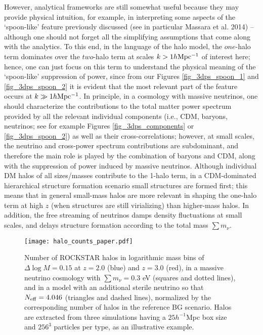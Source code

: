 \documentclass{emulateapj}
\begin{document}
However, analytical frameworks are still somewhat useful because they may provide physical intuition, 
for example, in interpreting some aspects of the  `spoon-like' feature previously discussed (see in particular Massara et al. 2014) -- although one should not forget all the simplifying 
assumptions that come along with the analytics.
To this end,  in the language of the halo model,
the $one$-halo term dominates over the $two$-halo term at scales $k>1 h {\rm Mpc^{-1}}$ of interest here; hence, one  can just focus on this term to
understand the physical meaning of the 
`spoon-like' suppression of power, since from our Figures \ref{fig_3dps_spoon_1} and \ref{fig_3dps_spoon_2}
it is evident that the most relevant part of the feature occurs at $k \gg1 h {\rm Mpc^{-1}}$. 
In principle, in a cosmology with massive neutrinos, one should characterize the
contributions to the total matter power spectrum provided by all the relevant individual components (i.e., CDM, baryons, neutrinos; see for example Figures \ref{fig_3dps_components} or \ref{fig_3dps_spoon_2})
as well as their cross-correlations; however, at small scales, the
neutrino and cross-power spectrum contributions are subdominant, 
and therefore the main role is played by the combination of baryons and CDM, along with the 
suppression of power induced by massive neutrinos. 
Although individual DM halos of all sizes/masses contribute to the 1-halo term, 
in a CDM-dominated hierarchical structure formation scenario small structures are formed first;
this means that in general small-mass halos are more relevant in shaping the one-halo term at high $z$ (when
structures are still  virializing) than higher-mass halos. In addition, 
the free streaming of neutrinos damps density fluctuations at small scales, and delays structure formation according to the total mass $\sum m_{\nu}$.



\begin{figure}
\centering
\texttt{[image: halo\_counts\_paper.pdf]}
\caption{ Number of ROCKSTAR halos in logarithmic mass bins of $\Delta \log M=0.15$ at $z=2.0$ (blue) and $z=3.0$ (red),  
in a massive neutrino cosmology with $\sum m_{\nu}=0.3$ eV (squares and dotted lines),
and in a model with an additional sterile neutrino so that $N_{\rm eff} =4.046$ (triangles and dashed lines), normalized by the 
corresponding  number of halos in the reference BG scenario. 
Halos are extracted from  three simulations having a $25h^{-1}$Mpc box size and $256^3$ particles per type, as an illustrative example.
}
\label{fig_rockstar_halos}
\end{figure}
\end{document}
